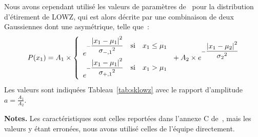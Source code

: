 \documentclass[../main/main.tex]{subfiles}
\begin{document}
Nous avons cependant utilisé les valeurs de paramètres de~\cite{scolnic2018}
pour la distribution d'étirement de LOWZ, qui est alors décrite par une
combinaison de deux Gaussiennes dont une asymétrique, telle que~:
\begin{equation}\label{eq:sklowz}
    P(x_1) = A_1\times
        \left\{
        \begin{array}{l}
            e^{-\displaystyle\frac{\abs{x_1-\mu_1}^2}{\sigma_{-,1}{}^2}
                \quad\text{si}\quad x_1\leq\mu_1} \\
            e^{-\displaystyle\frac{\abs{x_1-\mu_1}^2}{\sigma_{+,1}{}^2}
                \quad\text{si}\quad x_1>\mu_1} \\
        \end{array}
        \right. + A_2\times
        e^{-\displaystyle\frac{\abs{x_1-\mu_2}^2}{\sigma_{2}{}^2}}
\end{equation}
Les valeurs sont indiquées Tableau~\ref{tab:sklowz} avec le rapport d'amplitude
$a=\frac{A_1}{A_2}$. 

\begin{table}[ht]
    \centering
        \caption[Paramètres de la distribution d'étirement pour l'échantillon
        LOWZ des simulations SK]{Paramètres de la distribution sous-jacente
            d'étirement pour l'échantillon LOWZ dans notre reproduction de
        l'étude de~.}\label{tab:sklowz}
    \begin{threeparttable}
        \begin{tablenotes}[flushleft]
        \item\small \textbf{\hspace{-3,2pt}Notes.} Les caractéristiques sont
            celles reportées dans l'annexe C de~\cite{scolnic2018}, mais les
            valeurs y étant erronées, nous avons utilisé celles de l'équipe
            directement.
        \end{tablenotes}
    \end{threeparttable}
\end{table}
\end{document}
